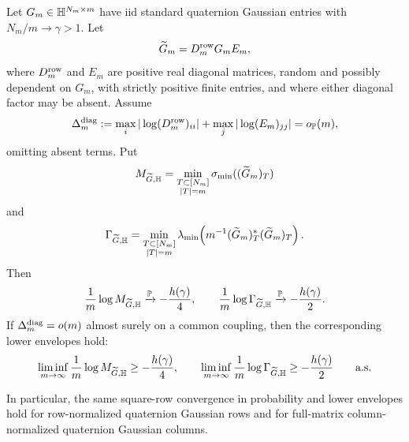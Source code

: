 \begin{corollary}\label{cor:quat-square-diagonal-normalized-exact}
Let \(G_m\in\mathbb{H}^{N_m\times m}\) have iid standard quaternion Gaussian entries
with \(N_m/m\to\gamma>1\).  Let
\[
  \widetilde G_m=D_m^{\rm row}G_mE_m,
\]
where \(D_m^{\rm row}\) and \(E_m\) are positive real diagonal matrices, random
and possibly dependent on \(G_m\), with strictly positive finite entries, and
where either diagonal factor may be absent.  Assume
\[
  \Delta_m^{\rm diag}:=
  \max_i|\log(D_m^{\rm row})_{ii}|
  +
  \max_j|\log(E_m)_{jj}|=o_{\mathbb{P}}(m),
\]
omitting absent terms.  Put
\[
  M_{\widetilde G,\mathbb{H}}
  =
  \min_{\substack{T\subset[N_m]\\ |T|=m}}\sigma_{\min}((\widetilde G_m)_T)
\]
and
\[
  \Gamma_{\widetilde G,\mathbb{H}}
  =
  \min_{\substack{T\subset[N_m]\\ |T|=m}}
  \lambda_{\min}\!\left(m^{-1}(\widetilde G_m)_T^*
  (\widetilde G_m)_T\right).
\]
Then
\[
  \frac1m\log M_{\widetilde G,\mathbb{H}}
  \xrightarrow{\mathbb{P}}
  -\frac{h(\gamma)}4,
  \qquad
  \frac1m\log \Gamma_{\widetilde G,\mathbb{H}}
  \xrightarrow{\mathbb{P}}
  -\frac{h(\gamma)}2 .
\]
If \(\Delta_m^{\rm diag}=o(m)\) almost surely on a common coupling, then the
corresponding lower envelopes hold:
\[
  \liminf_{m\to\infty}\frac1m\log M_{\widetilde G,\mathbb{H}}
  \ge -\frac{h(\gamma)}4,
  \qquad
  \liminf_{m\to\infty}\frac1m\log \Gamma_{\widetilde G,\mathbb{H}}
  \ge -\frac{h(\gamma)}2
  \qquad\hbox{a.s.}
\]

In particular, the same square-row convergence in probability and lower
envelopes hold for row-normalized quaternion Gaussian rows and for full-matrix
column-normalized quaternion Gaussian columns.
\end{corollary}

